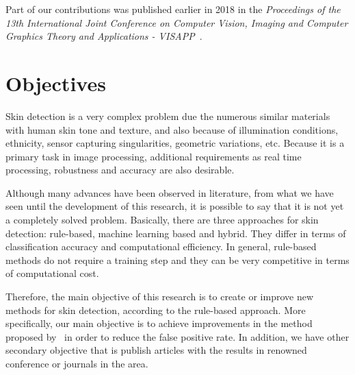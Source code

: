 Part of our contributions was published earlier in 2018 in the \emph{Proceedings of the 13th International Joint Conference on Computer Vision, Imaging and Computer Graphics Theory and Applications - VISAPP}~\citep{faria:18}.


\section{Objectives}
\label{sec:objectives}

Skin detection is a very complex problem due the numerous similar materials with human skin tone and texture, and also because of illumination conditions, ethnicity, sensor capturing singularities, geometric variations, etc. Because it is a primary task in image processing, additional requirements as real time processing, robustness and accuracy are also desirable.

Although many advances have been observed in literature, from what we have seen until the development of this research, it is possible to say that it is not yet a completely solved problem. Basically, there are three approaches for skin detection: rule-based, machine learning based and hybrid. They differ in terms of classification accuracy and computational efficiency. In general, rule-based methods do not require a training step and they can be very competitive in terms of computational cost.

Therefore, the main objective of this research is to create or improve new methods for skin detection, according to the rule-based approach. More specifically, our main objective is to achieve improvements in the method proposed by~\citet{brancati:17} in order to reduce the false positive rate. In addition, we have other secondary objective that is publish articles with the results in renowned conference or journals in the area.



